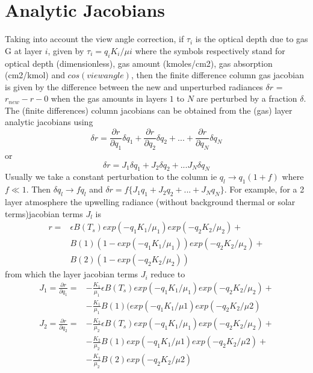 \documentclass[12pt]{article}
\begin{document}
\section{Analytic Jacobians}
Taking into account the view angle correction, if $\tau_{i}$ is the optical 
depth due to gas G at layer $i$, given by $\tau_{i} = q_{i} K_{i}/\mu{i}$ 
where the symbols respectively stand for optical depth (dimensionless), gas 
amount (kmoles/cm2), gas absorption (cm2/kmol) and $cos(view angle)$, then 
the finite difference column gas jacobian is 
given by the difference between the new and unperturbed radiances 
$\delta r$ = $r_{new} - r-{0}$ when the gas amounts in layers $1$ to $N$ are 
perturbed by a fraction $\delta$. The (finite differences) column jacobians 
can be obtained from the (gas) layer analytic jacobians using
\[
\delta r = \frac{\partial r}{\partial q_1} \delta q_1 + 
           \frac{\partial r}{\partial q_2} \delta q_2 + ... + 
           \frac{\partial r}{\partial q_N} \delta q_N
\] 
or 
\[
\delta r = J_{1} \delta q_1 + J_{2} \delta q_2 + ...
               J_{N} \delta q_N
\]
Usually we take a constant perturbation to the column ie $q_{l} \rightarrow 
q_{1}(1 + f)$ where $f \ll 1$. Then $\delta q_{l} \rightarrow f q_{l}$ and
$\delta r = f \{ J_{1} q_1 + J_{2} q_2 + ... + J_{N} q_N \} $. For example, 
for a 2 layer atmosphere the upwelling radiance (without background thermal 
or solar terms)jacobian terms $J_{l}$ is 
\begin{eqnarray*}
r = & \epsilon B(T_{s}) exp(-q_{1} K_{1}/\mu_{1})exp(-q_{2} K_{2}/\mu_{2}) +\\
    & B(1)(1-exp(-q_{1} K_{1}/\mu_{1}))exp(-q_{2} K_{2}/\mu_{2}) + \\
    & B(2)(1-exp(-q_{2} K_{2}/\mu_{2}))
\end{eqnarray*}
from which the layer jacobian terms $J_{i}$ reduce to
\begin{eqnarray*}
J_{1} = \frac{\partial r}{\partial q_1} = & 
 -\frac{K_1}{\mu_1}\epsilon B(T_{s})exp(-q_1 K_1/\mu_1)exp(-q_2 K_2/\mu_2) + \\
&-\frac{K_1}{\mu_1} B(1)(exp(-q_{1} K_{1}/\mu{1})exp(-q_{2} K_{2}/\mu{2})
\end{eqnarray*}
\begin{eqnarray*}
J_{2} = \frac{\partial r}{\partial q_2} = & 
-\frac{K_2}{\mu_2}\epsilon B(T_{s})exp(-q_1 K_1/\mu_1)exp(-q_2 K_2/\mu_2) + \\
& -\frac{K_2}{\mu_2} B(1)exp(-q_{1} K_{1}/\mu{1})exp(-q_{2} K_{2}/\mu{2}) + \\
& -\frac{K_2}{\mu_2} B(2)exp(-q_{2} K_{2}/\mu{2})
\end{eqnarray*}
\end{document}
